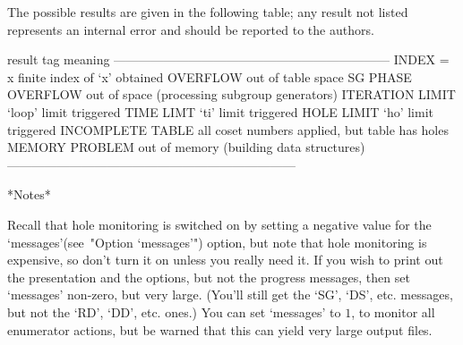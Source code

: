 
The possible results are given in the following table; any result  not
listed represents an internal error and  should  be  reported  to  the
{\ACE} authors.

\begintt
result tag           meaning 
------------------------------------------------------------------
INDEX = x            finite index of `x' obtained
OVERFLOW             out of table space
SG PHASE OVERFLOW    out of space (processing subgroup generators)
ITERATION LIMIT      `loop' limit triggered
TIME LIMT            `ti' limit triggered
HOLE LIMIT           `ho' limit triggered
INCOMPLETE TABLE     all coset numbers applied, but table has holes
MEMORY PROBLEM       out of memory (building data structures)
---------------------------------------------------------------------
\endtt


*Notes*

Recall that hole monitoring is switched on by setting a negative value
for the `messages'(see~"Option `messages'") option, but note that hole
monitoring is expensive, so don't turn it on unless  you  really  need
it. If you wish to print out the presentation and the options, but not
the progress messages, then set `messages' non-zero, but  very  large.
(You'll still get the `SG', `DS', etc. messages,  but  not  the  `RD',
`DD', etc. ones.) You can  set  `messages'  to  $1$,  to  monitor  all
enumerator actions, but be warned  that  this  can  yield  very  large
output files.

